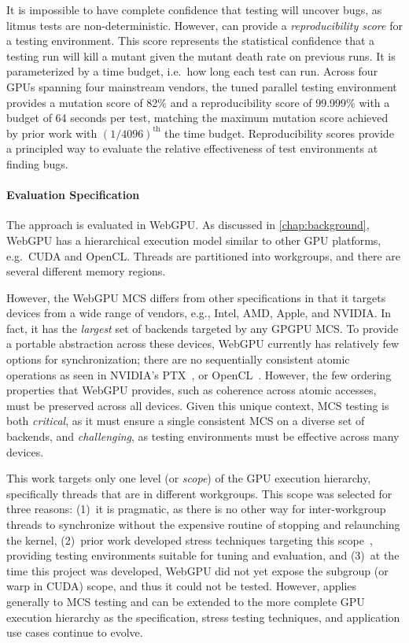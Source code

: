 It is impossible to have complete confidence that testing will uncover bugs, as litmus tests are non-deterministic. However, \sys can provide a \textit{reproducibility score} for a testing environment. This score represents the statistical confidence that a testing run will kill a mutant given the mutant death rate on previous runs. It is parameterized by a time budget, i.e.\ how long each test can run.
Across four GPUs spanning four mainstream vendors, the tuned parallel testing environment provides a mutation score of 82\% and a reproducibility score of 99.999\% with a budget of 64 seconds per test,
matching the maximum mutation score achieved by prior work with $(1/4096)^{\text{th}}$ the time budget. Reproducibility scores provide a principled way to evaluate the relative effectiveness of test environments at finding bugs.


\paragraph{Evaluation Specification} The approach is evaluated in WebGPU. As discussed in \mychap\ref{chap:background}, WebGPU has a hierarchical execution model similar to other GPU platforms, e.g.\ CUDA and OpenCL. Threads are partitioned into workgroups, and there are several different memory regions.

However, the WebGPU MCS differs from other specifications in that it targets devices from a wide range of vendors, e.g., Intel, AMD, Apple, and NVIDIA. In fact, it has the \textit{largest} set of backends targeted by any GPGPU MCS. To provide a portable abstraction across these devices, WebGPU currently has relatively few options for synchronization; there are no sequentially consistent atomic operations as seen in NVIDIA's PTX~\cite{lustig2019ptx}, or OpenCL~\cite{batty2016overhauling}. However, the few ordering properties that WebGPU provides, such as coherence across atomic accesses, must be preserved across all devices. Given this unique context, MCS testing is both \textit{critical}, as it must ensure a single consistent MCS on a diverse set of backends, and \textit{challenging}, as testing environments must be effective across many devices.

This work targets only one level (or \textit{scope}) of the GPU execution hierarchy, specifically threads that are in different workgroups. This scope was selected for three reasons: (1)~it is pragmatic, as there is no other way for inter-workgroup threads to synchronize without the expensive routine of stopping and relaunching the kernel, (2)~prior work developed stress techniques targeting this scope~\cite{kirkham2020foundations}, providing testing environments suitable for tuning and evaluation, and (3)~at the time this project was developed, WebGPU did not yet expose the subgroup (or warp in CUDA) scope, and thus it could not be tested. However, \sys applies generally to MCS testing and can be extended to the more complete GPU execution hierarchy as the specification, stress testing techniques, and application use cases continue to evolve.

